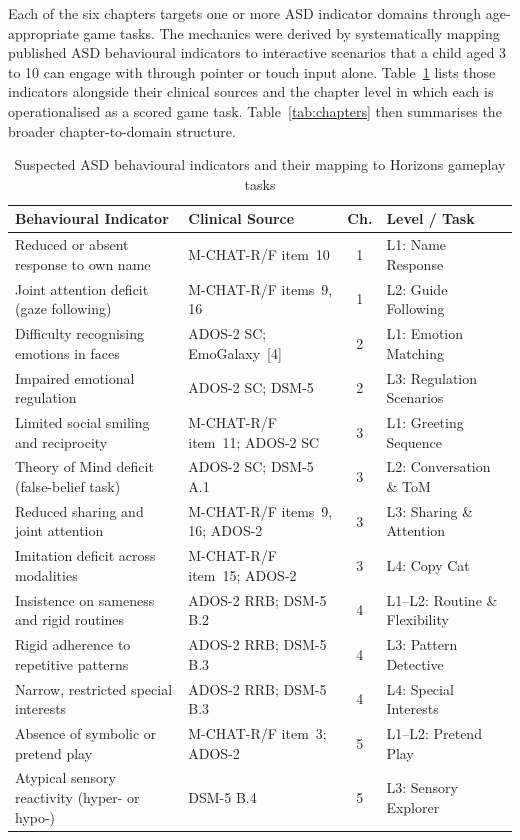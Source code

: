 \documentclass[12pt,a4paper,oneside]{report}
\begin{document}
Each of the six chapters targets one or more ASD indicator domains through age-appropriate game tasks. The mechanics were derived by systematically mapping published ASD behavioural indicators to interactive scenarios that a child aged 3 to 10 can engage with through pointer or touch input alone. Table~\ref{tab:behaviors} lists those indicators alongside their clinical sources and the chapter level in which each is operationalised as a scored game task. Table~\ref{tab:chapters} then summarises the broader chapter-to-domain structure.

\begin{table}[t]
  \caption{Suspected ASD behavioural indicators and their mapping to Horizons gameplay tasks}
  \label{tab:behaviors}
  \begin{tabularx}{\linewidth}{Xp{3.2cm}cp{2.8cm}}
    \toprule
    \textbf{Behavioural Indicator} & \textbf{Clinical Source} & \textbf{Ch.} & \textbf{Level / Task} \\
    \midrule
    Reduced or absent response to own name
      & M-CHAT-R/F item~10 & 1 & L1: Name Response \\
    Joint attention deficit (gaze following)
      & M-CHAT-R/F items~9, 16 & 1 & L2: Guide Following \\
    Difficulty recognising emotions in faces
      & ADOS-2 SC; EmoGalaxy~[4] & 2 & L1: Emotion Matching \\
    Impaired emotional regulation
      & ADOS-2 SC; DSM-5 & 2 & L3: Regulation Scenarios \\
    Limited social smiling and reciprocity
      & M-CHAT-R/F item~11; ADOS-2 SC & 3 & L1: Greeting Sequence \\
    Theory of Mind deficit (false-belief task)
      & ADOS-2 SC; DSM-5 A.1 & 3 & L2: Conversation \& ToM \\
    Reduced sharing and joint attention
      & M-CHAT-R/F items~9, 16; ADOS-2 & 3 & L3: Sharing \& Attention \\
    Imitation deficit across modalities
      & M-CHAT-R/F item~15; ADOS-2 & 3 & L4: Copy Cat \\
    Insistence on sameness and rigid routines
      & ADOS-2 RRB; DSM-5 B.2 & 4 & L1--L2: Routine \& Flexibility \\
    Rigid adherence to repetitive patterns
      & ADOS-2 RRB; DSM-5 B.3 & 4 & L3: Pattern Detective \\
    Narrow, restricted special interests
      & ADOS-2 RRB; DSM-5 B.3 & 4 & L4: Special Interests \\
    Absence of symbolic or pretend play
      & M-CHAT-R/F item~3; ADOS-2 & 5 & L1--L2: Pretend Play \\
    Atypical sensory reactivity (hyper- or hypo-)
      & DSM-5 B.4 & 5 & L3: Sensory Explorer \\
    \bottomrule
  \end{tabularx}
\end{table}
\end{document}
